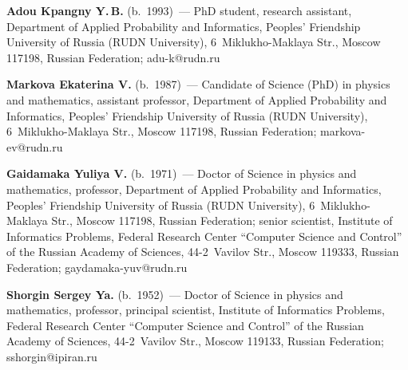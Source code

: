 \Contr

\vspace*{-3pt}

\noindent
\textbf{Adou Kpangny Y.\,B.} (b.\ 1993)~--- 
PhD student, research assistant, Department of Applied Probability and Informatics, Peoples' Friendship University of Russia (RUDN University), 
6~Miklukho-Maklaya Str., Moscow 117198, Russian Federation; \mbox{adu-k@rudn.ru}

\pagebreak

\noindent
\textbf{Markova Ekaterina V.} (b.\ 1987)~--- 
Candidate of Science (PhD) in physics and mathematics, assistant professor, Department of Applied Probability and Informatics, 
Peoples' Friendship University of Russia (RUDN University), 6~Miklukho-Maklaya Str., Moscow 117198, Russian Federation; 
\mbox{markova-ev@rudn.ru}

\vspace*{6pt}

\noindent
\textbf{Gaidamaka Yuliya V.} (b.\ 1971)~--- 
Doctor of Science in physics and mathematics, professor, Department of Applied Probability and Informatics, Peoples' 
Friendship University of Russia (RUDN University), 6~Miklukho-Maklaya Str., Moscow 117198, Russian Federation; 
senior scientist, Institute of Informatics Problems, Federal Research Center ``Computer Science and Control'' 
of the Russian Academy of Sciences, 44-2~Vavilov Str., Moscow 119333, Russian Federation; \mbox{gaydamaka-yuv@rudn.ru}

\vspace*{6pt}

\noindent
\textbf{Shorgin Sergey Ya.} (b.\ 1952)~--- 
Doctor of Science in physics and mathematics, professor, principal scientist, Institute of Informatics Problems, Federal Research Center 
``Computer Science and Control'' of the Russian Academy of Sciences, 44-2~Vavilov Str., Moscow 119133, Russian Federation; 
\mbox{sshorgin@ipiran.ru}



   
\label{end\stat}

\renewcommand{\bibname}{\protect\rm Литература} 
   